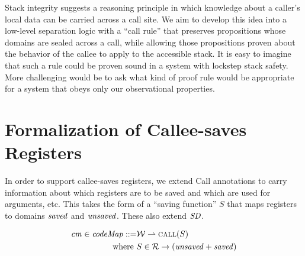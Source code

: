\documentclass[10pt,conference]{ieeetran}%
\theoremstyle{definition}
\begin{document}
{
%
Stack integrity suggests a reasoning principle in which knowledge about a
caller's local data can be carried across a call site. We aim to develop
this idea into a low-level separation logic with a ``call rule'' that
preserves propositions whose domains are sealed across a call, while
allowing those propositions proven about the behavior of the callee to apply
to the accessible stack.
%
It is easy to imagine that such a rule could be proven sound in a system
with lockstep stack safety. More challenging would be to ask what kind of
proof rule would be appropriate for a system that obeys only our
observational properties.






\pagebreak

\appendices
\section{Formalization of Callee-saves Registers}
\label{app:calleesave}

In order to support callee-saves registers, we extend {\sc Call} annotations to
carry information about which registers are to be saved and which are used for arguments,
etc. This takes the form of a ``saving function'' \(S\) that maps registers to domains \(\mathit{saved}\) and
\(\mathit{unsaved}\). These also extend \(\mathit{SD}\).

\[\begin{split}
\mathit{cm} \in \mathit{codeMap} ::= & {\mathcal W} \rightharpoonup \text{\sc call}(S)\\
\relax{\rm{where}} ~ & S \in {\mathcal R} \rightarrow (\mathit{unsaved} + \mathit{saved}) \\
\end{split}\]

}
\end{document}
